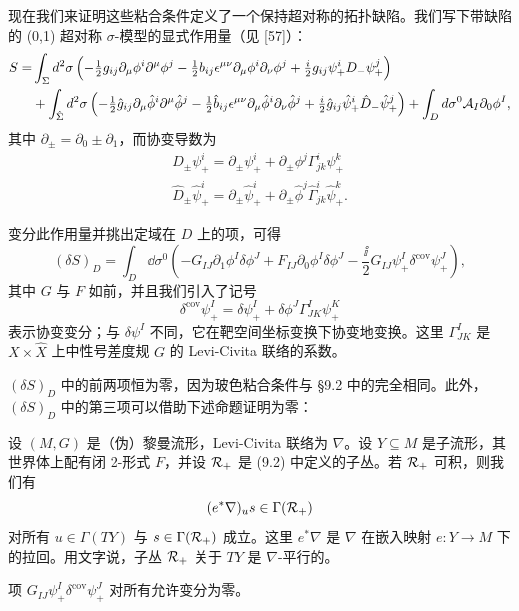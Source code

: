 现在我们来证明这些粘合条件定义了一个保持超对称的拓扑缺陷。我们写下带缺陷的 (0,1) 超对称 $\sigma$-模型的显式作用量（见 [57]）：
\begin{equation*}
\begin{aligned}
S=&\int_\Sigma d^2\sigma\left(-\tfrac12 g_{ij}\partial_\mu\phi^i\partial^\mu\phi^j-\tfrac12 b_{ij}\epsilon^{\mu\nu}\partial_\mu\phi^i\partial_\nu\phi^j+\tfrac{i}{2}g_{ij}\psi^i_+D_-\psi^j_+\right)\\
&+\int_{\hat\Sigma}d^2\sigma\left(-\tfrac12\hat g_{ij}\partial_\mu\hat\phi^i\partial^\mu\hat\phi^j-\tfrac12\hat b_{ij}\epsilon^{\mu\nu}\partial_\mu\hat\phi^i\partial_\nu\hat\phi^j+\tfrac{i}{2}\hat g_{ij}\hat\psi^i_+\hat D_-\hat\psi^j_+\right)+\int_D d\sigma^0\mathcal{A}_I\partial_0\phi^I,
\end{aligned}
\end{equation*}
其中 $\partial_\pm=\partial_0\pm\partial_1$，而协变导数为
\begin{gather*}
D_\pm\psi^i_+=\partial_\pm\psi^i_++\partial_\pm\phi^j\Gamma^i_{jk}\psi^k_+ \\
\hat D_\pm\hat\psi^i_+=\partial_\pm\hat\psi^i_++\partial_\pm\hat\phi^j\hat\Gamma^i_{jk}\hat\psi^k_+ . 
\end{gather*}

变分此作用量并挑出定域在 $D$ 上的项，可得
\[
(\delta S)_D=\int_D \dd\sigma^0\left(-G_{IJ}\partial_1\phi^I\delta\phi^J+F_{IJ}\partial_0\phi^I\delta\phi^J-\frac{\ii}{2}G_{IJ}\psi^I_+\delta^{\text{cov}}\psi^J_+\right),
\]
其中 $G$ 与 $F$ 如前，并且我们引入了记号
\[
\delta^{\text{cov}}\psi^I_+=\delta\psi^I_++\delta\phi^J\Gamma^I_{JK}\psi^K_+
\]
表示协变变分；与 $\delta\psi^I$ 不同，它在靶空间坐标变换下协变地变换。这里 $\Gamma^I_{JK}$ 是 $X\times\hat X$ 上中性号差度规 $G$ 的 Levi-Civita 联络的系数。

$(\delta S)_D$ 中的前两项恒为零，因为玻色粘合条件与 §9.2 中的完全相同。此外，$(\delta S)_D$ 中的第三项可以借助下述命题证明为零：

\begin{proposition}[7]
设 $(M,G)$ 是（伪）黎曼流形，Levi-Civita 联络为 $\nabla$。设 $Y\subseteq M$ 是子流形，其世界体上配有闭 2-形式 $F$，并设 $\mathcal{R}_+$ 是 (9.2) 中定义的子丛。若 $\mathcal{R}_+$ 可积，则我们有
\[
(e^*\nabla)_u s\in\Gamma(\mathcal{R}_+)
\]
对所有 $u\in\Gamma(TY)$ 与 $s\in\Gamma(\mathcal{R}_+)$ 成立。这里 $e^*\nabla$ 是 $\nabla$ 在嵌入映射 $e:Y\to M$ 下的拉回。用文字说，子丛 $\mathcal{R}_+$ 关于 $TY$ 是 $\nabla$-平行的。
\end{proposition}

\begin{proposition}[8]
项 $G_{IJ}\psi^I_+\delta^{\text{cov}}\psi^J_+$ 对所有允许变分为零。
\end{proposition}

